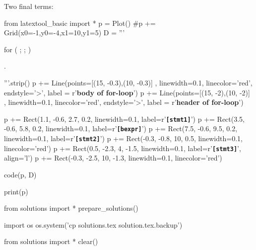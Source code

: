 Two final terms:
\begin{python}
from latextool_basic import *
p = Plot()
#p += Grid(x0=-1,y0=-4,x1=10,y1=5)
D = '''





for (         ;              ;                )




               .






'''.strip()
p += Line(points=[(15, -0.3),(10, -0.3)] , linewidth=0.1, linecolor='red', endstyle='>', label = r'\textbf{body of for-loop}')
p += Line(points=[(15, -2),(10, -2)] , linewidth=0.1, linecolor='red', endstyle='>', label = r'\textbf{header of for-loop}')

p += Rect(1.1, -0.6, 2.7, 0.2, linewidth=0.1, label=r'\texttt{\textbf{[stmt1]}}')
p += Rect(3.5, -0.6, 5.8, 0.2, linewidth=0.1, label=r'\texttt{\textbf{[bexpr]}}')
p += Rect(7.5, -0.6, 9.5, 0.2, linewidth=0.1, label=r'\texttt{\textbf{[stmt2]}}')
p += Rect(-0.3, -0.8, 10, 0.5, linewidth=0.1, linecolor='red')
p += Rect(0.5, -2.3, 4, -1.5, linewidth=0.1, label=r'\texttt{\textbf{[stmt3]}}', align='l')
p += Rect(-0.3, -2.5, 10, -1.3, linewidth=0.1, linecolor='red')

code(p, D)

print(p)
\end{python}
















\begin{python0}
from solutions import *
prepare_solutions()
\end{python0}
\begin{python}
import os
os.system('cp solutions.tex solution.tex.backup')  
\end{python}

\begin{python0}
from solutions import *
clear()
\end{python0}

